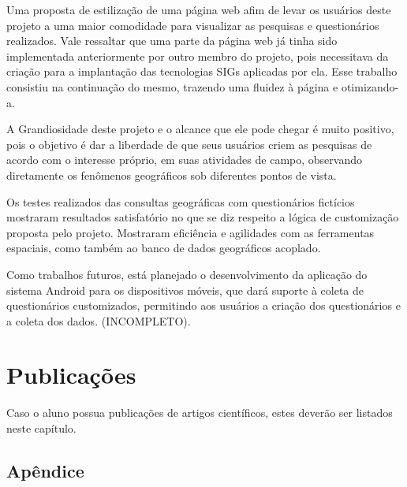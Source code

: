 \documentclass[
	12pt,				%
    oneside,			%
	a4paper,			%
	english,			%
	french,				%
	spanish,			%
	brazil,				%
	]{abntex2}
\begin{document}
Uma proposta de estilização de uma página web afim de levar os usuários deste projeto a uma maior comodidade para visualizar as pesquisas e questionários realizados.
Vale ressaltar que uma parte da página web já tinha sido implementada anteriormente por outro membro do projeto, pois necessitava da criação para a implantação das tecnologias SIGs aplicadas por ela. Esse trabalho consistiu na continuação do mesmo, trazendo uma fluidez à página e otimizando-a.

A Grandiosidade deste projeto e o alcance que ele pode chegar é muito positivo, pois o objetivo é dar a liberdade de que seus usuários criem as pesquisas de acordo com o interesse próprio, em suas atividades de campo, observando diretamente os fenômenos geográficos sob diferentes pontos de vista.

Os testes realizados das consultas geográficas com questionários fictícios mostraram resultados satisfatório no que se diz respeito a lógica de customização proposta pelo projeto. Mostraram eficiência e agilidades com as ferramentas espaciais, como também ao banco de dados geográficos acoplado.

Como trabalhos futuros, está planejado o desenvolvimento da aplicação do sistema Android para os dispositivos móveis, que dará suporte à coleta de questionários customizados, permitindo aos usuários a criação dos questionários e a coleta dos dados.
(INCOMPLETO).


\chapter{Publicações}
Caso o aluno possua publicações de artigos científicos, estes deverão ser listados neste capítulo.

\postextual



%
%


\begin{apendicesenv}

\partapendices

\chapter{Apêndice}


\end{apendicesenv}
\end{document}
